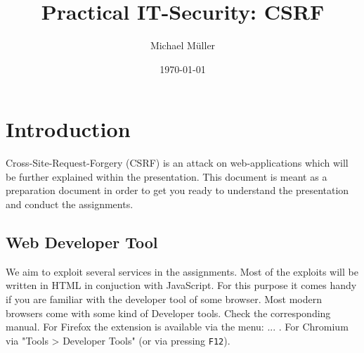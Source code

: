 \documentclass{report}
\title{Practical IT-Security: CSRF}
\author{Michael Müller}
\date{\today}
\begin{document}
\newpage

\maketitle

\newpage


\section{Introduction}

Cross-Site-Request-Forgery (\textsc{CSRF}) is an attack on web-applications
which will be further explained within the presentation.
This document is meant as a preparation document in order to get you ready to
understand the presentation and conduct the assignments.

\begin{comment}
\subsection{HTTP}
The HTTP protocol is the driving force behind the web.

\subsubsection{GET}
foo ar



\begin{lstlisting}[
	caption=Typical HTTP GET request
]
GET / HTTP/1.1
Host: google.com
\end{lstlisting}

\begin{lstlisting}[
	caption=Typical HTTP GET reply
]
200 OK 
\end{lstlisting}

\subsubsection{POST}
\end{comment}


\subsection{Web Developer Tool}

We aim to exploit several services in the assignments. Most of the exploits
will be written in HTML in conjuction with JavaScript. For this purpose it
comes handy if you are familiar with the developer tool of some browser.
Most modern browsers come with some kind of Developer tools. Check the
corresponding manual. For Firefox the extension is available via the menu:
... .
For Chromium via "Tools > Developer Tools" (or via pressing \texttt{F12}).
\end{document}
